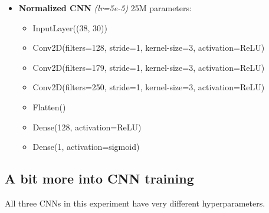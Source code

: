 \begin{itemize}
    \item \textbf{Normalized CNN} \textit{(lr=5e-5)} 25M parameters:
    \begin{itemize}
        \item InputLayer((38, 30))
        \item Conv2D(filters=128, stride=1, kernel-size=3, activation=ReLU)
        \item Conv2D(filters=179, stride=1, kernel-size=3, activation=ReLU)
        \item Conv2D(filters=250, stride=1, kernel-size=3, activation=ReLU)
        \item Flatten()
        \item Dense(128, activation=ReLU)
        \item Dense(1, activation=sigmoid)
    \end{itemize}
\end{itemize}

\subsection{A bit more into CNN training}

All three CNNs in this experiment have very different hyperparameters. 

